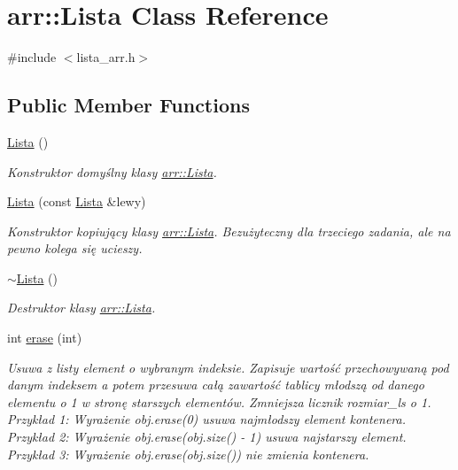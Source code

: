 \hypertarget{classarr_1_1_lista}{\section{arr\-:\-:Lista Class Reference}
\label{classarr_1_1_lista}
}


{\ttfamily \#include $<$lista\-\_\-arr.\-h$>$}

\subsection*{Public Member Functions}
\begin{DoxyCompactItemize}
\item 
\hyperlink{classarr_1_1_lista_a11b61b647380e962aeeb35848c427b81}{Lista} ()
\begin{DoxyCompactList}\small\item\em Konstruktor domyślny klasy \hyperlink{classarr_1_1_lista}{arr\-::\-Lista}. \end{DoxyCompactList}\item 
\hyperlink{classarr_1_1_lista_a29bae0190a2d5c38ebfdf33eb05d1c09}{Lista} (const \hyperlink{classarr_1_1_lista}{Lista} \&lewy)
\begin{DoxyCompactList}\small\item\em Konstruktor kopiujący klasy \hyperlink{classarr_1_1_lista}{arr\-::\-Lista}. Bezużyteczny dla trzeciego zadania, ale na pewno kolega się ucieszy. \end{DoxyCompactList}\item 
\hyperlink{classarr_1_1_lista_ac3b5f77b08befbf28e922179dcace594}{$\sim$\-Lista} ()
\begin{DoxyCompactList}\small\item\em Destruktor klasy \hyperlink{classarr_1_1_lista}{arr\-::\-Lista}. \end{DoxyCompactList}\item 
int \hyperlink{classarr_1_1_lista_ad370aa7f4e6bf3f2492f5187c9d64d56}{erase} (int)
\begin{DoxyCompactList}\small\item\em Usuwa z listy element o wybranym indeksie. Zapisuje wartość przechowywaną pod danym indeksem a potem przesuwa całą zawartość tablicy młodszą od danego elementu o 1 w stronę starszych elementów. Zmniejsza licznik rozmiar\-\_\-ls o 1. Przykład 1\-: Wyrażenie obj.\-erase(0) usuwa najmłodszy element kontenera. Przykład 2\-: Wyrażenie obj.\-erase(obj.\-size() -\/ 1) usuwa najstarszy element. Przykład 3\-: Wyrażenie obj.\-erase(obj.\-size()) nie zmienia kontenera. \end{DoxyCompactList}\item 

\end{DoxyCompactItemize}
